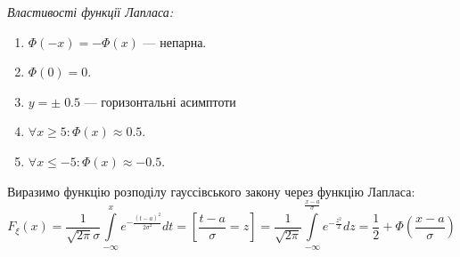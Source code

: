\noindent
\emph{Властивості функції Лапласа: }
    \begin{enumerate}
        \item $\Phi(-x) = -\Phi(x)$ --- непарна.
        \item $\Phi(0) = 0$.
        \item $y = \pm \;0.5$ --- горизонтальні асимптоти
        \item $\forall x \geq 5: \Phi(x) \approx 0.5 $.
        \item $\forall x \leq -5: \Phi(x) \approx -0.5 $.
    \end{enumerate}

\noindent Виразимо функцію розподілу гауссівського закону через функцію Лапласа:
\begin{equation}
    F_\xi (x) = \frac{1}{\sqrt{2\pi}\sigma} \int\limits_{-\infty}^{x} 
    e^{-\frac{(t-a)^2}{2\sigma^2}} dt = 
    \left[\frac{t-a}{\sigma} = z\right] = 
    \frac{1}{\sqrt{2\pi}} \int\limits_{-\infty}^{\frac{x-a}{\sigma}} 
    e^{-\frac{z^2}{2}} dz = \frac{1}{2} + 
    \Phi\left(\frac{x-a}{\sigma}\right)
\end{equation}


